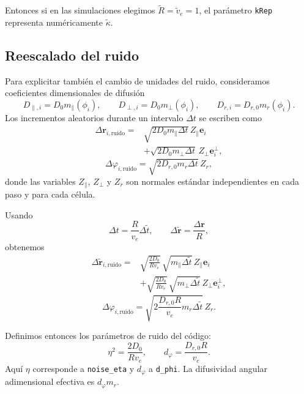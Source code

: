 \documentclass[11pt,a4paper]{article}
\begin{document}
Entonces si en las simulaciones elegimos $\widetilde R=\widetilde v_e=1$, el parámetro \texttt{kRep} representa numéricamente $\widetilde \kappa$.

\subsection{Reescalado del ruido}

Para explicitar también el cambio de unidades del ruido,
consideramos coeficientes dimensionales de difusión
\begin{equation}
	D_{\parallel,i}=D_0m_\parallel(\phi_i),
	\qquad
	D_{\perp,i}=D_0m_\perp(\phi_i),
	\qquad
	D_{r,i}=D_{r,0}m_r(\phi_i).
\end{equation}
Los incrementos aleatorios durante un intervalo
$\Delta t$ se escriben como
\begin{equation}
	\begin{split}
		\Delta\bm r_{i,\mathrm{ruido}}
		={}&
		\sqrt{2D_0m_\parallel\Delta t}\,
		Z_\parallel\bm e_i\\
		&+
		\sqrt{2D_0m_\perp\Delta t}\,
		Z_\perp\bm e_i^\perp,
	\end{split}
\end{equation}
\begin{equation}
	\Delta\varphi_{i,\mathrm{ruido}}
	=
	\sqrt{2D_{r,0}m_r\Delta t}\,Z_r,
\end{equation}
donde las variables $Z_\parallel$, $Z_\perp$ y $Z_r$
son normales estándar independientes en cada paso
y para cada célula.

Usando
\begin{equation}
	\Delta t=\frac{R}{v_e}\Delta\widetilde t,
	\qquad
	\Delta\widetilde{\bm r}=\frac{\Delta\bm r}{R},
\end{equation}
obtenemos
\begin{equation}
	\begin{split}
		\Delta\widetilde{\bm r}_{i,\mathrm{ruido}}
		={}&
		\sqrt{\frac{2D_0}{Rv_e}}\,
		\sqrt{m_\parallel\Delta\widetilde t}\,
		Z_\parallel\bm e_i\\
		&+
		\sqrt{\frac{2D_0}{Rv_e}}\,
		\sqrt{m_\perp\Delta\widetilde t}\,
		Z_\perp\bm e_i^\perp,
	\end{split}
\end{equation}
\begin{equation}
	\Delta\varphi_{i,\mathrm{ruido}}
	=
	\sqrt{
		2\frac{D_{r,0}R}{v_e}
		m_r\Delta\widetilde t
	}\,Z_r.
\end{equation}

Definimos entonces los parámetros de ruido del código:
\begin{equation}
	\boxed{
		\eta^2=\frac{2D_0}{Rv_e},
		\qquad
		d_\varphi=\frac{D_{r,0}R}{v_e}
	}.
\end{equation}
Aquí $\eta$ corresponde a \texttt{noise\_eta} y
$d_\varphi$ a \texttt{d\_phi}. La difusividad angular
adimensional efectiva es $d_\varphi m_r$.
\end{document}
